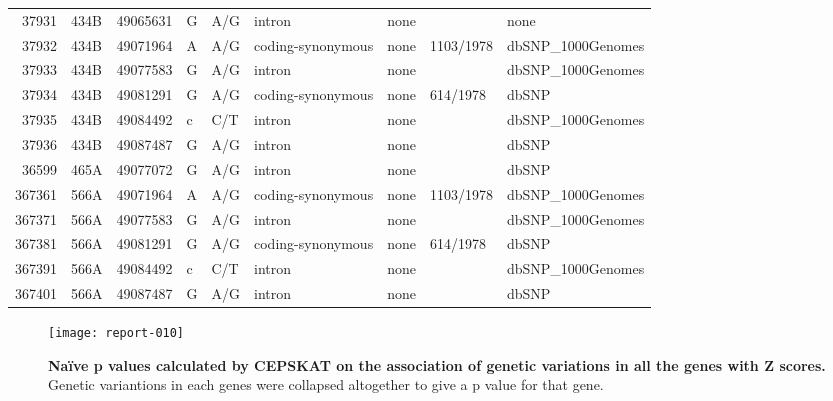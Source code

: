 \documentclass{article}
\begin{document}
\begin{table}[tbp]
{\begin{tabular}{rlrllllll}
  37931 & 434B & 49065631 & G & A/G & intron & none &  & none \\ 
  37932 & 434B & 49071964 & A & A/G & coding-synonymous & none & 1103/1978 & dbSNP\_1000Genomes \\ 
  37933 & 434B & 49077583 & G & A/G & intron & none &  & dbSNP\_1000Genomes \\ 
  37934 & 434B & 49081291 & G & A/G & coding-synonymous & none & 614/1978 & dbSNP \\ 
  37935 & 434B & 49084492 & c & C/T & intron & none &  & dbSNP\_1000Genomes \\ 
  37936 & 434B & 49087487 & G & A/G & intron & none &  & dbSNP \\ 
  36599 & 465A & 49077072 & G & A/G & intron & none &  & dbSNP \\ 
  367361 & 566A & 49071964 & A & A/G & coding-synonymous & none & 1103/1978 & dbSNP\_1000Genomes \\ 
  367371 & 566A & 49077583 & G & A/G & intron & none &  & dbSNP\_1000Genomes \\ 
  367381 & 566A & 49081291 & G & A/G & coding-synonymous & none & 614/1978 & dbSNP \\ 
  367391 & 566A & 49084492 & c & C/T & intron & none &  & dbSNP\_1000Genomes \\ 
  367401 & 566A & 49087487 & G & A/G & intron & none &  & dbSNP \\ 
   \hline
\end{tabular}
}
\end{table}

\begin{figure}[htb]
\centering
\texttt{[image: report-010]}

\caption{{\bf {Na\"ive p values calculated by CEPSKAT on the association of genetic variations in all the genes with Z scores.}} Genetic variantions in each genes were collapsed altogether to give a p value for that gene. }
\label{fig:allGene}
\end{figure}
\end{document}
